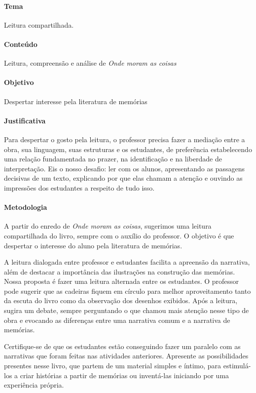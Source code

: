 \documentclass[11pt]{extarticle}
\begin{document}
\paragraph{Tema} Leitura compartilhada.  

\paragraph{Conteúdo} Leitura, compreensão e análise de \textit{Onde moram as coisas}

\paragraph{Objetivo} Despertar interesse pela literatura de memórias 

\paragraph{Justificativa} Para despertar o gosto pela leitura, o professor precisa fazer a mediação entre a obra, sua linguagem, suas estruturas e os estudantes, de preferência estabelecendo uma relação fundamentada no prazer, na identificação e na liberdade de interpretação. Eis o nosso desafio: ler com os alunos, apresentando as passagens decisivas de um texto, explicando por que elas chamam a atenção e  ouvindo as impressões dos estudantes a respeito de tudo isso. 

\paragraph{Metodologia}

A partir do enredo de \textit{Onde moram as coisas}, sugerimos uma leitura compartilhada do livro, sempre com o auxílio do professor. O objetivo é que despertar o interesse do aluno pela literatura de memórias. 

A leitura dialogada entre professor e estudantes facilita a apreensão da narrativa, além de destacar a importância das ilustrações na construção das memórias. Nossa proposta é fazer uma leitura alternada entre os estudantes. O professor pode sugerir que as cadeiras fiquem em círculo para melhor aproveitamento tanto da escuta do livro como da observação dos desenhos exibidos. Após a leitura, sugira um debate, sempre perguntando o que chamou mais atenção nesse tipo de obra e evocando as diferenças entre uma narrativa comum e a narrativa de memórias. 

Certifique-se de que os estudantes estão conseguindo fazer um paralelo com as narrativas que foram feitas nas atividades anteriores. Apresente as possibilidades presentes nesse livro, que partem de um material simples e íntimo, para estimulá-los a criar histórias a partir de memórias ou inventá-las iniciando por uma experiência própria.
\end{document}
